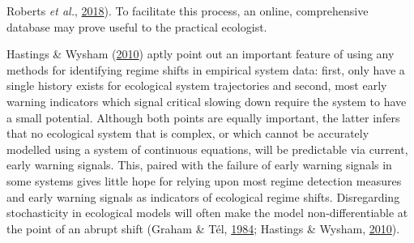 \documentclass[print]{nuthesis}
\begin{document}
Roberts \emph{et al.}, \protect\hyperlink{ref-roberts2018early}{2018}). To facilitate this process, an online, comprehensive database may prove useful to the practical ecologist.

Hastings \& Wysham (\protect\hyperlink{ref-hastings2010regime}{2010}) aptly point out an important feature of using any methods for identifying regime shifts in empirical system data: first, only have a single history exists for ecological system trajectories and second, most early warning indicators which signal critical slowing down require the system to have a small potential. Although both points are equally important, the latter infers that no ecological system that is complex, or which cannot be accurately modelled using a system of continuous equations, will be predictable via current, early warning signals. This, paired with the failure of early warning signals in some systems gives little hope for relying upon most regime detection measures and early warning signals as indicators of ecological regime shifts. Disregarding stochasticity in ecological models will often make the model non-differentiable at the point of an abrupt shift (Graham \& Tél, \protect\hyperlink{ref-graham1984existence}{1984}; Hastings \& Wysham, \protect\hyperlink{ref-hastings2010regime}{2010}).
\end{document}
